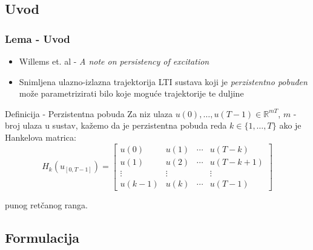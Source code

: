 \documentclass[10pt]{beamer}
\begin{document}
\subsection{Uvod}
\begin{frame}
    \frametitle{Lema - Uvod}
    \begin{itemize}
        \item Willems et. al - \textit{A note on persistency of excitation}
        \item Snimljena ulazno-izlazna trajektorija LTI sustava koji je \textit{perzistentno pobuđen} može parametrizirati bilo koje moguće trajektorije te duljine
    \end{itemize}
    
    \begin{block}{Definicija - Perzistentna pobuda}
        Za niz ulaza $u(0), \dots, u(T-1) \in \mathbb{R}^{mT}$, $m$ - broj ulaza u sustav, kažemo da je perzistentna pobuda reda $k \in \{1, \dots, T\}$
        ako je Hankelova matrica:
        \[H_{k}(u_{[0, T-1]}) =
        \begin{bmatrix}
        u(0) & u(1) & \cdots & u(T-k) \\
        u(1) & u(2) & \cdots & u(T-k+1)\\
        \vdots & \vdots &  & \vdots \\
        u(k-1) & u(k) & \cdots & u(T-1)
        \end{bmatrix}\]    

        punog retčanog ranga.

\end{block}

\end{frame}

\subsection{Formulacija}
\end{document}
